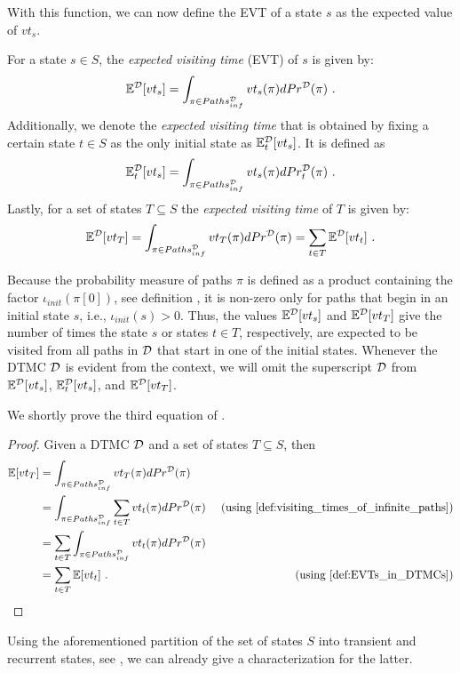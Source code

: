 With this function, we can now define the EVT of a state $s$ as the expected value of $vt_s$.

\begin{definition}\label{def:EVTs_in_DTMCs}
    For a state $s\in S$, the \textit{expected visiting time} (EVT) of $s$ is given by:
    \[\Exp^{\MC}[vt_s]=\int_{\pi\in\Path}vt_s(\pi)dPr^{\MC}(\pi)\ .\]
    Additionally, we denote the \textit{expected visiting time} that is obtained by fixing a certain state $t\in S$ as the only initial state as $\mathbb{E}^{\mathcal{D}}_t[vt_s]$. It is defined as
    \[\Exp^{\MC}_t[vt_s]=\int_{\pi\in\Path}vt_s(\pi)dPr_t^{\MC}(\pi)\ .\]
    Lastly, for a set of states $T\subseteq S$ the \textit{expected visiting time} of $T$ is given by:
    \[\Exp^{\MC}[vt_T] = \int_{\pi\in\Path}vt_T(\pi)dPr^{\MC}(\pi) = \sum_{t\in T}\Exp^\MC[vt_t]\ .\]
\end{definition}
Because the probability measure of paths $\pi$ is defined as a product containing the factor $\iota_{init}(\pi[0])$, see definition , it is non-zero only for paths that begin in an initial state $s$, i.e., $\iota_{init}(s)>0$. Thus, the values $\mathbb{E}^{\mathcal{D}}[vt_s]$ and $\mathbb{E}^{\mathcal{D}}[vt_T]$ give the number of times the state $s$ or states $t \in T$, respectively, are expected to be visited from all paths in $\mathcal{D}$ that start in one of the initial states. Whenever the DTMC $\mathcal{D}$ is evident from the context, we will omit the superscript $\mathcal{D}$ from $\mathbb{E}^{\mathcal{D}}[vt_s]$, $\mathbb{E}^{\mathcal{D}}_t[vt_s]$, and $\mathbb{E}^{\mathcal{D}}[vt_T]$.

We shortly prove the third equation of .
\begin{proof}
    Given a DTMC $\mathcal{D}$ and a set of states $T \subseteq S$, then
    \begin{align}
        \Exp[vt_T] 
        & = \int_{\pi\in\Path}vt_T(\pi)dPr^{\MC}(\pi) \notag \\
        & = \int_{\pi\in\Path}\sum_{t\in T}vt_t(\pi)dPr^{\MC}(\pi) & \text{ (using \Cref{def:visiting_times_of_infinite_paths})} \notag \\
        & = \sum_{t\in T}\int_{\pi\in\Path}vt_t(\pi)dPr^{\MC}(\pi) \notag \\
        & = \sum_{t\in T}\Exp[vt_t] \ . & \text{ (using \Cref{def:EVTs_in_DTMCs})} \notag
    \end{align}
\end{proof}

Using the aforementioned partition of the set of states $S$ into transient and recurrent states, see , we can already give a characterization for the latter.

